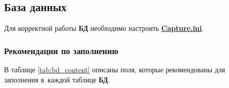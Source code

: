 \subsection{База данных} \label{ssec:bd}

Для корректной работы \textbf{БД} необходимо настроить \hyperref[ssec:capture_ini]{\textbf{Capture.ini}}.



\subsubsection{Рекомендации по заполнению} \label{sssec:bd_contet}
В таблице \ref{tab:bd_content} описаны поля, которые рекомендованы для заполнения в~каждой таблице \textbf{БД}.

